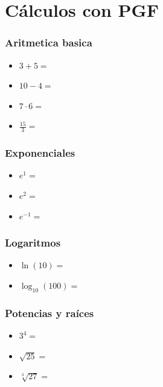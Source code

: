 \documentclass{beamer}
\newcommand{\entero}[1]{\pgfmathprintnumber[fixed, precision=0]{#1}}
\begin{document}
\section{Cálculos con PGF}
\begin{frame}
  \frametitle{Aritmetica basica}
  \begin{itemize}
    \item $3 + 5 =$ \entero{\suma}
    \item $10 - 4=$ \entero{\resta}
    \item $7 \cdot 6 =$ \entero{\multiplicacion}
    \item $\frac{15}{3} =$ \entero{\division}
    \end{itemize}

\end{frame}

\begin{frame}
  \frametitle{Exponenciales}
  \begin{itemize}
    \item $e^1 =$ \textbf{\expoUno}
    \item $e^2 =$ \textbf{\expoDos}
    \item $e^{-1} =$ \textbf{\expNegativo}
  \end{itemize}
\end{frame}

\begin{frame}
  \frametitle{Logaritmos}
  \begin{itemize}
    \item $\ln(10) =$ \textbf{\logNatural}
    \item $\log_{10}(100) =$ \textbf{\logBaseTen}
  \end{itemize}
\end{frame}

\begin{frame}
  \frametitle{Potencias y raíces}
  \begin{itemize}
    \item $3^4 =$ \textbf{\potencia}
    \item $\sqrt{25} =$ \textbf{\raizCuadrada}
    \item $\sqrt[3]{27} =$ \textbf{\raizCubo}
  \end{itemize}
\end{frame}
\end{document}

